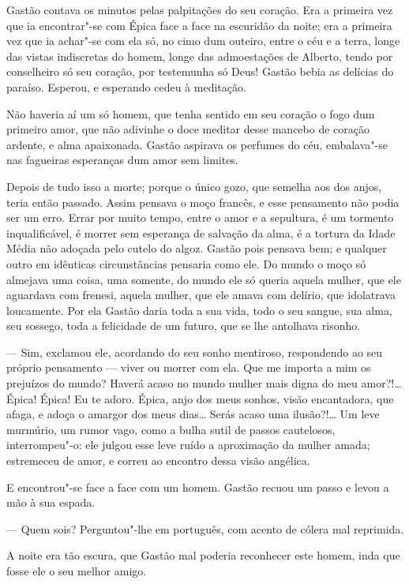 Gastão contava os minutos pelas palpitações do seu coração. Era a
primeira vez que ia encontrar"-se com Épica face a face na escuridão da
noite; era a primeira vez que ia achar"-se com ela só, no cimo dum
outeiro, entre o céu e a terra, longe das vistas indiscretas do homem,
longe das admoestações de Alberto, tendo por conselheiro só seu coração,
por testemunha só Deus! Gastão bebia as delícias do paraíso. Esperou, e
esperando cedeu à meditação.

Não haveria aí um só homem, que tenha sentido em seu coração o fogo dum
primeiro amor, que não adivinhe o doce meditar desse mancebo de coração
ardente, e alma apaixonada. Gastão aspirava os perfumes do céu,
embalava"-se nas fagueiras esperanças dum amor sem limites.

Depois de tudo isso a morte; porque o único gozo, que semelha aos dos
anjos, teria então passado. Assim pensava o moço francês, e esse pensamento não podia ser um erro. Errar por muito tempo, entre o amor e a
sepultura, é um tormento inqualificável, é morrer sem esperança de
salvação da alma, é a tortura da Idade Média não adoçada pelo cutelo do
algoz. Gastão pois pensava bem; e qualquer outro em idênticas
circunstâncias pensaria como ele. Do mundo o moço só almejava uma coisa,
uma somente, do mundo ele só queria aquela mulher, que ele aguardava com
frenesi, aquela mulher, que ele amava com delírio, que idolatrava
loucamente. Por ela Gastão daria toda a sua vida, todo o seu sangue, sua
alma, seu sossego, toda a felicidade de um futuro, que se lhe antolhava
risonho.

--- Sim, exclamou ele, acordando do seu sonho mentiroso, respondendo ao
seu próprio pensamento --- viver ou morrer com ela. Que me importa a mim
os prejuízos do mundo? Haverá acaso no mundo mulher mais digna do meu
amor?!\ldots{} Épica! Épica! Eu te adoro. Épica, anjo dos meus sonhos, visão
encantadora, que afaga, e adoça o amargor dos meus dias\ldots{} Serás acaso
uma ilusão?!\ldots{} Um leve murmúrio, um rumor vago, como a bulha sutil de
passos cautelosos, interrompeu"-o: ele julgou esse leve ruído a
aproximação da mulher amada; estremeceu de amor, e correu ao encontro
dessa visão angélica.

E encontrou"-se face a face com um homem. Gastão recuou um passo e levou
a mão à sua espada.

--- Quem sois? Perguntou"-lhe em português, com acento de cólera mal
reprimida.

A noite era tão escura, que Gastão mal poderia reconhecer este homem,
inda que fosse ele o seu melhor amigo.

